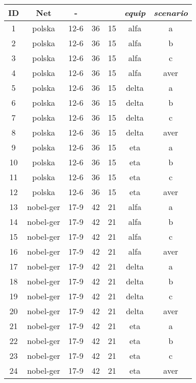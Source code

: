 \documentclass[final,5p,times,twocolumn]{elsarticle}
\begin{document}
\begin{table}[!htc]
\begin{center}
\begin{tabular}{ccccccc}
ID	& Net	     & -	& 	& 	& \textit{equip} & \textit{scenario}	\\
\hline
1	& polska	 &  12-6	        &  36	    & 15	& alfa	 & a \\
2	& polska	 &  12-6	        &  36	    & 15	& alfa	 & b \\
3	& polska	 &  12-6	        &  36	    & 15	& alfa	 & c \\
4	& polska	 &  12-6	        &  36	    & 15	& alfa	 & aver \\
5	& polska	 &  12-6	        &  36	    & 15	& delta	 & a \\
6	& polska	 &  12-6	        &  36	    & 15	& delta	 & b \\
7	& polska	 &  12-6	        &  36	    & 15	& delta	 & c \\
8	& polska	 &  12-6	        &  36	    & 15	& delta	 & aver \\
9	& polska	 &  12-6	        &  36	    & 15	& eta	 & a \\
10	& polska	 &  12-6	        &  36	    & 15	& eta	 & b \\
11	& polska	 &  12-6	        &  36	    & 15	& eta	 & c \\
12	& polska	 &  12-6	        &  36	    & 15	& eta    & aver \\
\hline                                                          
13	& nobel-ger  &  17-9	        &  42	    & 21	& alfa	 & a \\
14	& nobel-ger  &  17-9	        &  42	    & 21	& alfa	 & b \\
15	& nobel-ger  &  17-9	        &  42	    & 21	& alfa	 & c \\
16	& nobel-ger  &  17-9	        &  42	    & 21	& alfa	 & aver \\
17  & nobel-ger  &  17-9	        &  42	    & 21	& delta	 & a \\
18	& nobel-ger  &  17-9	        &  42	    & 21	& delta	 & b \\
19	& nobel-ger  &  17-9	        &  42	    & 21	& delta	 & c \\
20	& nobel-ger  &  17-9	        &  42	    & 21	& delta	 & aver \\
21	& nobel-ger  &  17-9	        &  42	    & 21	& eta	 & a \\
22	& nobel-ger  &  17-9	        &  42	    & 21	& eta	 & b \\
23	& nobel-ger  &  17-9	        &  42	    & 21	& eta	 & c \\
24	& nobel-ger  &  17-9	        &  42	    & 21	& eta    & aver \\

\end{tabular}
\end{center}
\end{table}
\end{document}
